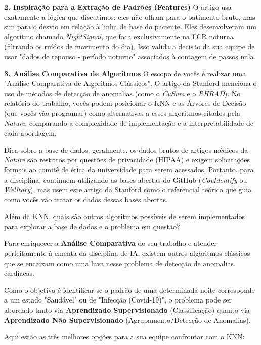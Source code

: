 \begin{description}
    \textbf{2. Inspiração para a Extração de Padrões (Features)}
    O artigo usa exatamente a lógica que discutimos: eles não olham para o batimento bruto, mas sim para o desvio em relação à linha de base do paciente. Eles desenvolveram um algoritmo chamado \textit{NightSignal}, que foca exclusivamente na FCR noturna (filtrando os ruídos de movimento do dia). Isso valida a decisão da sua equipe de usar "dados de repouso - período noturno" associados à contagem de passos nula.

    \textbf{3. Análise Comparativa de Algoritmos}
    O escopo de vocês é realizar uma "Análise Comparativa de Algoritmos Clássicos". O artigo da Stanford menciona o uso de métodos de detecção de anomalias (como o \textit{CuSum} e o \textit{RHRAD}). No relatório do trabalho, vocês podem posicionar o KNN e as Árvores de Decisão (que vocês vão programar) como alternativas a esses algoritmos citados pela \textit{Nature}, comparando a complexidade de implementação e a interpretabilidade de cada abordagem.

    Dica sobre a base de dados: geralmente, os dados brutos de artigos médicos da \textit{Nature} são restritos por questões de privacidade (HIPAA) e exigem solicitações formais ao comitê de ética da universidade para serem acessados. Portanto, para a disciplina, continuem utilizando as bases abertas do GitHub (\textit{CovIdentify} ou \textit{Welltory}), mas usem este artigo da Stanford como o referencial teórico que guia como vocês vão tratar os dados dessas bases abertas.

    \item[Aluno:] Além da KNN, quais são outros algoritmos possíveis de serem implementados para explorar a base de dados e o problema em questão?

    \item[Gemini:] Para enriquecer a \textbf{Análise Comparativa} do seu trabalho e atender perfeitamente à ementa da disciplina de IA, existem outros algoritmos clássicos que se encaixam como uma luva nesse problema de detecção de anomalias cardíacas.

    Como o objetivo é identificar se o padrão de uma determinada noite corresponde a um estado "Saudável" ou de "Infecção (Covid-19)", o problema pode ser abordado tanto via \textbf{Aprendizado Supervisionado} (Classificação) quanto via \textbf{Aprendizado Não Supervisionado} (Agrupamento/Detecção de Anomalias).

    Aqui estão as três melhores opções para a sua equipe confrontar com o KNN:


\end{description}
